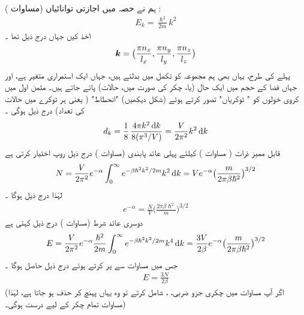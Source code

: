 ہم نے حصہ    میں  اجازتی توانائیاں  (مساوات ) :
\begin{align}
E_k = \frac{\hslash^2}{2 m} k^2
\end{align}
اخذ کیں  جہاں درج ذیل تھا ۔
\begin{align*}
{\ensuremath{{\boldsymbol{k}}}} = \big ( \frac{\pi n_x}{l_x} , \frac{\pi n_y}{l_y} , \frac{\pi n_z}{l_z} \big )
\end{align*}
پہلے کی  طرح،  یہاں بھی ہم مجموعہ کو تکمل میں بدلتے ہیں،  جہاں  ایک استمراری متغیر ہے،  اور جہاں  فضا کے  حجم میں ایک حال  (یا،  چکر  کی صورت میں،   حالات)  پائے جاتے ہیں۔ مثمن اول میں کروی  خولوں کو   "  ٹوکریاں" تصور کرتے ہوئے  (شکل  دیکھیں) "انحطاط" ( یعنی ہر ٹوکرے  میں حالات کی تعداد)  درج ذیل ہوگی ۔
\begin{align}\label{مساوات_متماثل_انحطاط_خول_کی}
d_k = \frac{1}{8}\, \frac{4 \pi k^2 \dif  k}{8 (\pi^3 /V)} = \frac{V}{2 \pi^2} k^2 \dif k
\end{align}
قابل ممیز ذرات ( مساوات  )   کیلئے پہلی  عائد  پابندی (مساوات )  درج ذیل روپ اختیار کرتی ہے 
\begin{align*}
N = \frac{V}{2 \pi^2} e^{- \alpha} \int_0^{\infty} e^{- \beta \hslash^2 k^2 / 2m} k^2 \dif  k = V e^{- \alpha} \big ( \frac{m}{2 \pi \beta \hslash^2} \big )^{3/2}
\end{align*}
لہٰذا درج ذیل ہوگا ۔
\begin{align}\label{مساوات_متماثل_درمیانہ_نتیجہ}
e^{- \alpha} = \frac{N}{V} \big ( \frac{2 \pi \beta \hslash^2}{m} \big )^{3/2}
\end{align}
دوسری  عائد  شرط (مساوات )   درج ذیل کہتی ہے 
\begin{align*}
E = \frac{V}{2 \pi^2} e^{- \alpha} \frac{\hslash^2}{2 m} \int_0^\infty e^{- \beta \hslash^2 k^2 /2m} k^4 \dif k = \frac{3 V}{2 \beta} e^{- \alpha} \big ( \frac{m}{2 \pi \beta \hslash^2} \big )^{3/2}
\end{align*}
جس میں مساوات  سے  پر کرتے ہوئے درج ذیل حاصل ہوگا ۔
\begin{align}\label{مساوات_متماثل_درست_ہر_صورت}
E = \frac{3 N}{2 \beta}
\end{align}
(اگر آپ مساوات  میں چکری جزو  ضربی، ،  شامل کرتے  تو وہ یہاں  پہنچ کر  حذف ہو جاتا ہے، لہٰذا مساوات  تمام چکر کے لیے درست ہوگی۔) 

